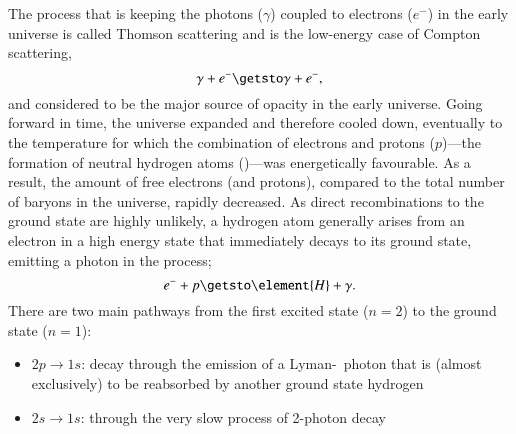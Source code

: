 


The process that is keeping the photons ($\gamma$) coupled to electrons ($e^{-}$) in the early universe is called Thomson scattering and is the low-energy case of Compton scattering,
\begin{equation}\label{mil2:theo:eq:Compton_Thomson}
    \gamma + e^{-} \getsto \gamma + e^{-},
\end{equation}
and considered to be the major source of opacity in the early universe. Going forward in time, the universe expanded and therefore cooled down, eventually to the temperature for which the combination of electrons and protons ($p$)---the formation of neutral hydrogen atoms ()---was energetically favourable. As a result, the amount of free electrons (and protons), compared to the total number of baryons in the universe, rapidly decreased. As direct recombinations to the ground state are highly unlikely, a hydrogen atom generally arises from an electron in a high energy state that immediately decays to its ground state, emitting a photon in the process;
\begin{equation}\label{mil2:theo:eq:relevant_interaction}
    e^{-} + p \getsto \element{H}+\gamma.
\end{equation}
There are two main pathways from the first excited state ($n=2$) to the ground state ($n=1$):
\begin{itemize}
    \item $2p\to 1s$: decay through the emission of a Lyman-\textalpha~photon that is (almost exclusively) to be reabsorbed by another ground state hydrogen
    \item $2s\to 1s$: through the very slow process of 2-photon decay
\end{itemize}
